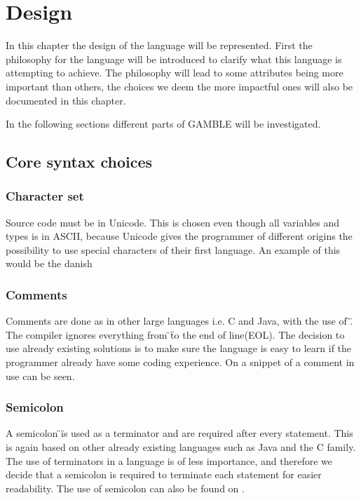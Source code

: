 \chapter{Design}
\label{cha:Design}
In this chapter the design of the language will be represented.
First the philosophy for the language will be introduced to clarify what this language is attempting to achieve.
The philosophy will lead to some attributes being more important than others, the choices we deem the more impactful ones will also be documented in this chapter.



In the following sections different parts of GAMBLE will be investigated.

\section{Core syntax choices}

\subsection*{Character set}
Source code must be in Unicode.
This is chosen even though all variables and types is in ASCII, because Unicode gives the programmer of different origins the possibility to use special characters of their first language.
An example of this would be the danish %

\subsection*{Comments}
Comments are done as in other large languages i.e. C and Java, with the use of \"\/\/\".
The compiler ignores everything from \"\/\/\" to the end of line(EOL).
The decision to use already existing solutions is to make sure the language is easy to learn if the programmer already have some coding experience.
On  a snippet of a comment in use can be seen.

\subsection*{Semicolon}
A semicolon \"\;\" is used as a terminator and are required after every statement.
This is again based on other already existing languages such as Java and the C family.
The use of terminators in a language is of less importance, and therefore we decide that a semicolon is required to terminate each statement for easier readability.
The use of semicolon can also be found on .

